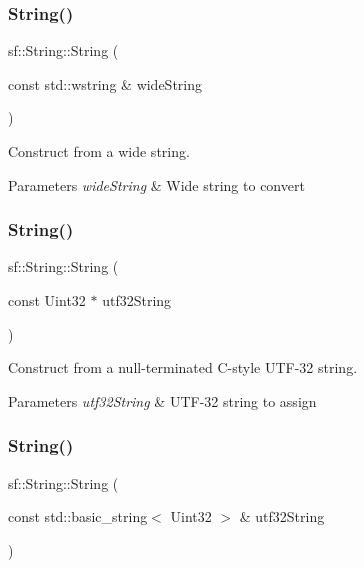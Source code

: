 \subsubsection{\texorpdfstring{String()}{String()}\hspace{0.1cm}{\footnotesize\ttfamily [8/11]}}
{\footnotesize\ttfamily sf\+::\+String\+::\+String (\begin{DoxyParamCaption}\item[{const std\+::wstring \&}]{wide\+String }\end{DoxyParamCaption})}



Construct from a wide string. 


\begin{DoxyParams}{Parameters}
{\em wide\+String} & Wide string to convert \\
\hline
\end{DoxyParams}
\mbox{\label{classsf_1_1_string_aea3629adf19f9fe713d4946f6c75b214}} 
\subsubsection{\texorpdfstring{String()}{String()}\hspace{0.1cm}{\footnotesize\ttfamily [9/11]}}
{\footnotesize\ttfamily sf\+::\+String\+::\+String (\begin{DoxyParamCaption}\item[{const Uint32 $\ast$}]{utf32\+String }\end{DoxyParamCaption})}



Construct from a null-\/terminated C-\/style U\+T\+F-\/32 string. 


\begin{DoxyParams}{Parameters}
{\em utf32\+String} & U\+T\+F-\/32 string to assign \\
\hline
\end{DoxyParams}
\mbox{\label{classsf_1_1_string_a6eee86dbe75d16bbcc26e97416c2e1ca}} 
\subsubsection{\texorpdfstring{String()}{String()}\hspace{0.1cm}{\footnotesize\ttfamily [10/11]}}
{\footnotesize\ttfamily sf\+::\+String\+::\+String (\begin{DoxyParamCaption}\item[{const std\+::basic\+\_\+string$<$ Uint32 $>$ \&}]{utf32\+String }\end{DoxyParamCaption})}



